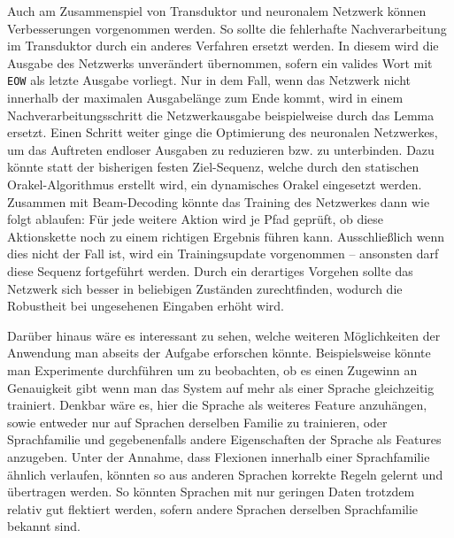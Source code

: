 \documentclass[11pt,a4paper]{article}
\newcommand{\action}[1]{\texttt{#1}}
\begin{document}
Auch am Zusammenspiel von Transduktor und neuronalem Netzwerk können Verbesserungen vorgenommen werden.
So sollte die fehlerhafte Nachverarbeitung im Transduktor durch ein anderes Verfahren ersetzt werden.
In diesem wird die Ausgabe des Netzwerks unverändert übernommen, sofern ein valides Wort mit \action{EOW} als letzte Ausgabe vorliegt.
Nur in dem Fall, wenn das Netzwerk nicht innerhalb der maximalen Ausgabelänge zum Ende kommt, wird in einem Nachverarbeitungsschritt die Netzwerkausgabe beispielweise durch das Lemma ersetzt.
Einen Schritt weiter ginge die Optimierung des neuronalen Netzwerkes, um das Auftreten endloser Ausgaben zu reduzieren bzw. zu unterbinden.
Dazu könnte statt der bisherigen festen Ziel-Sequenz, welche durch den statischen Orakel-Algorithmus erstellt wird, ein dynamisches Orakel eingesetzt werden.
Zusammen mit Beam-Decoding könnte das Training des Netzwerkes dann wie folgt ablaufen:
Für jede weitere Aktion wird je Pfad geprüft, ob diese Aktionskette noch zu einem richtigen Ergebnis führen kann.
Ausschließlich wenn dies nicht der Fall ist, wird ein Trainingsupdate vorgenommen -- ansonsten darf diese Sequenz fortgeführt werden.
Durch ein derartiges Vorgehen sollte das Netzwerk sich besser in beliebigen Zuständen zurechtfinden, wodurch die Robustheit bei ungesehenen Eingaben erhöht wird.



Darüber hinaus wäre es interessant zu sehen, welche weiteren Möglichkeiten der Anwendung man abseits der Aufgabe erforschen könnte. Beispielsweise könnte man Experimente durchführen um zu beobachten, ob es einen Zugewinn an Genauigkeit gibt wenn man das System auf mehr als einer Sprache gleichzeitig trainiert. Denkbar wäre es, hier die Sprache als weiteres Feature anzuhängen, sowie entweder nur auf Sprachen derselben Familie zu trainieren, oder Sprachfamilie und gegebenenfalls andere Eigenschaften der Sprache als Features anzugeben. Unter der Annahme, dass Flexionen innerhalb einer Sprachfamilie ähnlich verlaufen, könnten so aus anderen Sprachen korrekte Regeln gelernt und übertragen werden. So könnten Sprachen mit nur geringen Daten trotzdem relativ gut flektiert werden, sofern andere Sprachen derselben Sprachfamilie bekannt sind.
\end{document}
